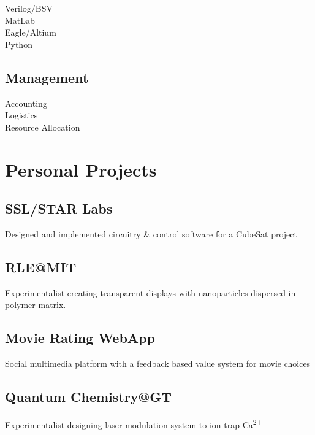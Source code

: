 \documentclass[letterpaper, article]{deedy-resume-openfont}
\begin{document}
\begin{minipage}[t]{0.33\textwidth}
Verilog/BSV \hspace{2.625cm} \textbullet \textbullet  \textbullet \textbullet \textbullet \\
MatLab \hspace{3.28cm} \textbullet \textbullet \textbullet \textbullet  \textbullet\\
Eagle/Altium \hspace{2.53cm} \textbullet \textbullet \textbullet \textbullet \\
Python \hspace{3.37cm}  \textbullet \textbullet  \textbullet \\

\sectionsep

\subsection{Management}
Accounting \hspace{2.75cm} \textbullet \textbullet \textbullet  \textbullet \textbullet\\
Logistics \hspace{3.15cm} \textbullet \textbullet  \textbullet \textbullet \\
Resource Allocation \hspace{1.47cm} \textbullet \textbullet \textbullet \textbullet \\

\section{Personal Projects}

\subsection{SSL/STAR Labs \hfill}
Designed and implemented circuitry \& control software for a CubeSat project
 \sectionsep
\subsection{RLE@MIT\hfill}
Experimentalist creating transparent displays with nanoparticles dispersed in polymer matrix.
 \sectionsep
\subsection{Movie Rating WebApp\hfill}
Social multimedia platform with a feedback based value system for movie choices
\sectionsep
\subsection{Quantum Chemistry@GT\hfill}
Experimentalist designing laser modulation system to ion trap Ca\textsuperscript{2+}

\end{minipage}
\end{document}
